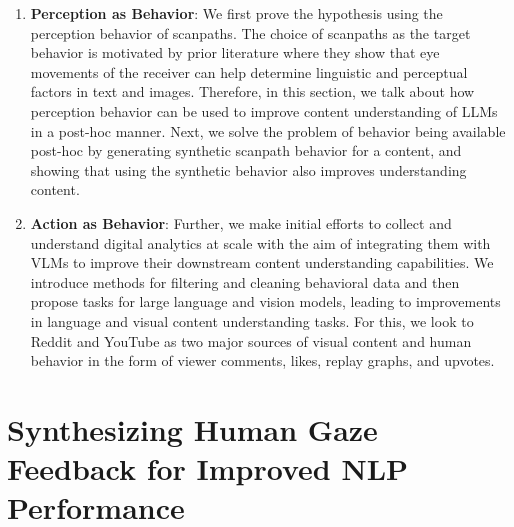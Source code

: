 \begin{enumerate}
    \item \textbf{Perception as Behavior}: We first prove the hypothesis using the perception behavior of scanpaths. The choice of scanpaths as the target behavior is motivated by prior literature \cite{clifton2007eye,demberg2008data,karessli2017gaze,yu2017supervising,he2019human,boyd2022human,mishra-etal-2016-harnessing,long-etal-2017-cognition} where they show that eye movements of the receiver can help determine linguistic and perceptual factors in text and images. Therefore, in this section, we talk about how perception behavior can be used to improve content understanding of LLMs in a post-hoc manner. Next, we solve the problem of behavior being available post-hoc by generating synthetic scanpath behavior for a content, and showing that using the synthetic behavior also improves understanding content. 


    \item \textbf{Action as Behavior}: Further, we make initial efforts to collect and understand digital analytics at scale with the aim of integrating them with VLMs to improve their downstream content understanding capabilities. We introduce methods for filtering and cleaning behavioral data and then propose tasks for large language and vision models, leading to improvements in language and visual content understanding tasks. For this, we look to Reddit and YouTube as two major sources of visual content and human behavior in the form of viewer comments, likes, replay graphs, and upvotes.
\end{enumerate}






\section{Synthesizing Human Gaze Feedback for Improved NLP Performance}
\label{sec:Synthesizing Human Gaze Feedback for Improved NLP Performance}

